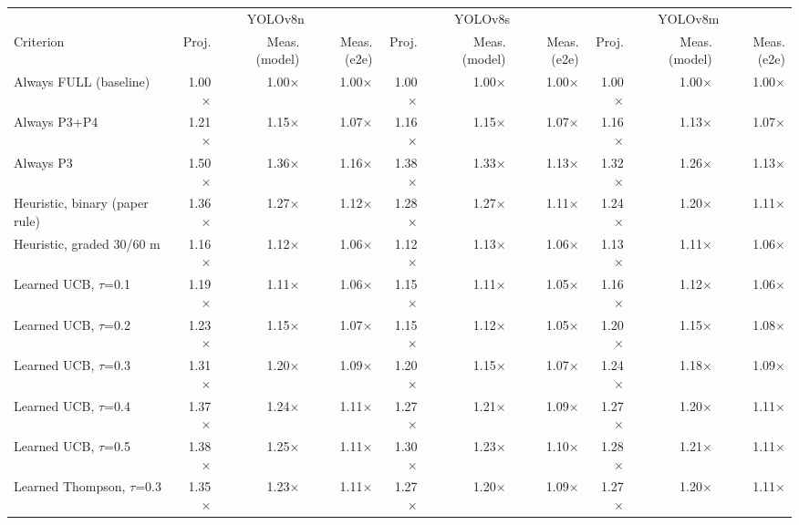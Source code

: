 \begin{table}[t]
\centering
\small
\begin{tabular}{lrrrrrrrrr}
\toprule
 & \multicolumn{3}{c}{YOLOv8n} & \multicolumn{3}{c}{YOLOv8s} & \multicolumn{3}{c}{YOLOv8m} \\
\cmidrule(lr){2-4}\cmidrule(lr){5-7}\cmidrule(lr){8-10}
Criterion & Proj. & Meas. (model) & Meas. (e2e) & Proj. & Meas. (model) & Meas. (e2e) & Proj. & Meas. (model) & Meas. (e2e) \\
\midrule
Always FULL (baseline) & 1.00$\times$ & 1.00$\times$ & 1.00$\times$ & 1.00$\times$ & 1.00$\times$ & 1.00$\times$ & 1.00$\times$ & 1.00$\times$ & 1.00$\times$ \\
Always P3+P4 & 1.21$\times$ & 1.15$\times$ & 1.07$\times$ & 1.16$\times$ & 1.15$\times$ & 1.07$\times$ & 1.16$\times$ & 1.13$\times$ & 1.07$\times$ \\
Always P3 & 1.50$\times$ & 1.36$\times$ & 1.16$\times$ & 1.38$\times$ & 1.33$\times$ & 1.13$\times$ & 1.32$\times$ & 1.26$\times$ & 1.13$\times$ \\
Heuristic, binary (paper rule) & 1.36$\times$ & 1.27$\times$ & 1.12$\times$ & 1.28$\times$ & 1.27$\times$ & 1.11$\times$ & 1.24$\times$ & 1.20$\times$ & 1.11$\times$ \\
Heuristic, graded 30/60 m & 1.16$\times$ & 1.12$\times$ & 1.06$\times$ & 1.12$\times$ & 1.13$\times$ & 1.06$\times$ & 1.13$\times$ & 1.11$\times$ & 1.06$\times$ \\
\midrule
Learned UCB, $\tau$=0.1 & 1.19$\times$ & 1.11$\times$ & 1.06$\times$ & 1.15$\times$ & 1.11$\times$ & 1.05$\times$ & 1.16$\times$ & 1.12$\times$ & 1.06$\times$ \\
Learned UCB, $\tau$=0.2 & 1.23$\times$ & 1.15$\times$ & 1.07$\times$ & 1.15$\times$ & 1.12$\times$ & 1.05$\times$ & 1.20$\times$ & 1.15$\times$ & 1.08$\times$ \\
Learned UCB, $\tau$=0.3 & 1.31$\times$ & 1.20$\times$ & 1.09$\times$ & 1.20$\times$ & 1.15$\times$ & 1.07$\times$ & 1.24$\times$ & 1.18$\times$ & 1.09$\times$ \\
Learned UCB, $\tau$=0.4 & 1.37$\times$ & 1.24$\times$ & 1.11$\times$ & 1.27$\times$ & 1.21$\times$ & 1.09$\times$ & 1.27$\times$ & 1.20$\times$ & 1.11$\times$ \\
Learned UCB, $\tau$=0.5 & 1.38$\times$ & 1.25$\times$ & 1.11$\times$ & 1.30$\times$ & 1.23$\times$ & 1.10$\times$ & 1.28$\times$ & 1.21$\times$ & 1.11$\times$ \\
Learned Thompson, $\tau$=0.3 & 1.35$\times$ & 1.23$\times$ & 1.11$\times$ & 1.27$\times$ & 1.20$\times$ & 1.09$\times$ & 1.27$\times$ & 1.20$\times$ & 1.11$\times$ \\

\end{tabular}
\end{table}
